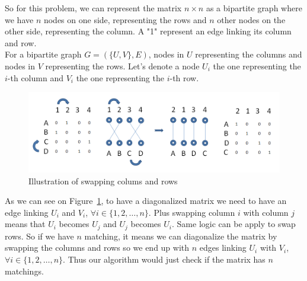 So for this problem, we can represent the matrix $n\times n$ as a bipartite graph where we have $n$ nodes on one side, representing the rows and $n$ other nodes on the other side, representing the column. A "1" represent an edge linking its column and row.\\
For a bipartite graph $G = (\{U, V\}, E)$, nodes in $U$ representing the columns and nodes in $V$ representing the rows. Let's denote a node $U_i$ the one representing the $i$-th column and $V_i$ the one representing the $i$-th row.\\
\begin{figure}[here]
\includegraphics[scale=0.5]{matrix-matching}
\caption{Illustration of swapping colums and rows}
\label{fig:matrix-matching}
\end{figure}
As we can see on Figure~\ref{fig:matrix-matching}, to have a diagonalized matrix we need to have an edge linking $U_i$ and $V_i$, $\forall i \in \{1,2,\dots,n\}$. Plus swapping column $i$ with column $j$ means that $U_i$ becomes $U_j$ and $U_j$ becomes $U_i$. Same logic can be apply to swap rows. So if we have $n$ matching, it means we can diagonalize the matrix by swapping the columns and rows so we end up with $n$ edges linking $U_i$ with $V_i$, $\forall i \in \{1,2,\dots,n\}$. Thus our algorithm would just check if the matrix has $n$ matchings.